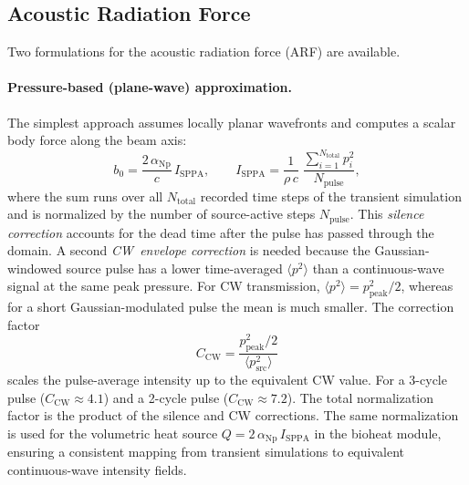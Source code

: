 \documentclass[11pt]{article}
\begin{document}
\subsection{Acoustic Radiation Force}

Two formulations for the acoustic radiation force (ARF) are available.

\paragraph{Pressure-based (plane-wave) approximation.}
The simplest approach assumes locally planar wavefronts and computes a scalar
body force along the beam axis:
\begin{equation}
  b_0 = \frac{2\,\alpha_{\mathrm{Np}}}{c}\,I_{\mathrm{SPPA}},
  \qquad
  I_{\mathrm{SPPA}} = \frac{1}{\rho\, c}
    \;\frac{\sum_{i=1}^{N_{\mathrm{total}}} p_i^2}{N_{\mathrm{pulse}}},
  \label{eq:isppa_norm}
\end{equation}
where the sum runs over all $N_{\mathrm{total}}$ recorded time steps of the
transient simulation and is normalized by the number of source-active steps
$N_{\mathrm{pulse}}$.  This \emph{silence correction} accounts for the dead
time after the pulse has passed through the domain.  A second
\emph{CW~envelope correction} is needed because the Gaussian-windowed
source pulse has a lower time-averaged $\langle p^2 \rangle$ than a
continuous-wave signal at the same peak pressure.  For CW transmission,
$\langle p^2 \rangle = p_{\mathrm{peak}}^2/2$, whereas for a short
Gaussian-modulated pulse the mean is much smaller.  The correction factor
\begin{equation}
  C_{\mathrm{CW}} = \frac{p_{\mathrm{peak}}^2 / 2}
                          {\langle p_{\mathrm{src}}^2 \rangle}
  \label{eq:cw_correction}
\end{equation}
scales the pulse-average intensity up to the equivalent CW value.  For a
3-cycle pulse ($C_{\mathrm{CW}} \approx 4.1$) and a 2-cycle pulse
($C_{\mathrm{CW}} \approx 7.2$).  The total normalization factor is the
product of the silence and CW corrections.
The same normalization is used for the volumetric heat source
$Q = 2\,\alpha_{\mathrm{Np}}\,I_{\mathrm{SPPA}}$ in the bioheat module,
ensuring a consistent mapping from transient simulations to equivalent
continuous-wave intensity fields.
\end{document}

